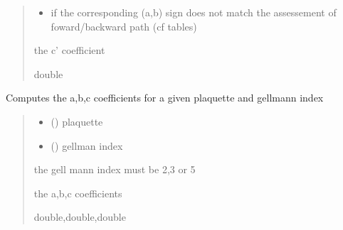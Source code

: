 \documentclass[letterpaper,10pt,english]{sphinxmanual}
\begin{document}
\begin{fulllineitems}
\begin{quote}
\begin{description}
\begin{itemize}
\item {} 
\sphinxAtStartPar
{} \textendash{} if the corresponding (a,b) sign does not match the assessement of foward/backward path (cf tables)

\end{itemize}

\sphinxAtStartPar
the c’ coefficient

\sphinxAtStartPar
double

\end{description}\end{quote}

\end{fulllineitems}


\begin{fulllineitems}
\label{\detokenize{analytical_reject:analytical_reject.coeffs}}
\pysigstartsignatures
\pysiglinewithargsret
{}
{\sphinxparamcomma {}}
{}
\pysigstopsignatures
\sphinxAtStartPar
Computes the a,b,c coefficients for a given plaquette and gell\sphinxhyphen{}mann index
\begin{quote}\begin{description}
\begin{itemize}
\item {} 
\sphinxAtStartPar
{} () \textendash{} plaquette

\item {} 
\sphinxAtStartPar
{} () \textendash{} gell\sphinxhyphen{}man index

\end{itemize}

\sphinxAtStartPar
{} \textendash{} the gell mann index must be 2,3 or 5

\sphinxAtStartPar
the a,b,c coefficients

\sphinxAtStartPar
double,double,double

\end{description}\end{quote}

\end{fulllineitems}
\end{document}
